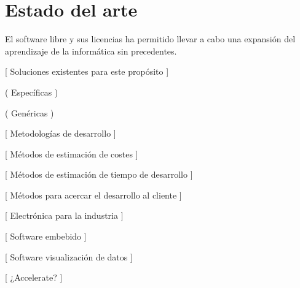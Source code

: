 \chapter{Estado del arte}

El software libre y sus licencias \cite{agplv3} ha permitido
llevar a cabo una expansión del aprendizaje de la informática
sin precedentes.

[ Soluciones existentes para este propósito ]

( Específicas )

( Genéricas )

[ Metodologías de desarrollo ]

[ Métodos de estimación de costes ]

[ Métodos de estimación de tiempo de desarrollo ]

[ Métodos para acercar el desarrollo al cliente ]

[ Electrónica para la industria ]

[ Software embebido ]

[ Software visualización de datos ]

[ ¿Accelerate? ]
